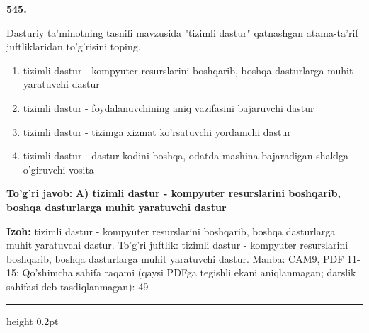 \documentclass[10pt,a4paper]{article}
\begin{document}
{\bfseries\sffamily\color{ink} 545.}
\par
Dasturiy ta'minotning tasnifi mavzusida "tizimli dastur" qatnashgan atama-ta'rif juftliklaridan to'g'risini toping.
\begin{enumerate}[label=\Alph*),leftmargin=9mm]
\item tizimli dastur - kompyuter resurslarini boshqarib, boshqa dasturlarga muhit yaratuvchi dastur
\item tizimli dastur - foydalanuvchining aniq vazifasini bajaruvchi dastur
\item tizimli dastur - tizimga xizmat ko'rsatuvchi yordamchi dastur
\item tizimli dastur - dastur kodini boshqa, odatda mashina bajaradigan shaklga o'giruvchi vosita
\end{enumerate}
\begin{tcolorbox}[enhanced,breakable,colback=teal!4,colframe=teal!60!black,boxrule=0.45pt,arc=1.2mm,left=2.7mm,right=2.7mm,top=1.8mm,bottom=1.8mm,before skip=2mm,after skip=2mm]
{\bfseries\sffamily\color{teal}To'g'ri javob:} \textbf{A) tizimli dastur - kompyuter resurslarini boshqarib, boshqa dasturlarga muhit yaratuvchi dastur}
\par\smallskip
{\bfseries Izoh:} tizimli dastur - kompyuter resurslarini boshqarib, boshqa dasturlarga muhit yaratuvchi dastur. To'g'ri juftlik: tizimli dastur - kompyuter resurslarini boshqarib, boshqa dasturlarga muhit yaratuvchi dastur. Manba: CAM9, PDF 11-15; Qo'shimcha sahifa raqami (qaysi PDFga tegishli ekani aniqlanmagan; darslik sahifasi deb tasdiqlanmagan): 49
\end{tcolorbox}
\vspace{2mm}\hrule height 0.2pt\vspace{3mm}
\end{document}
